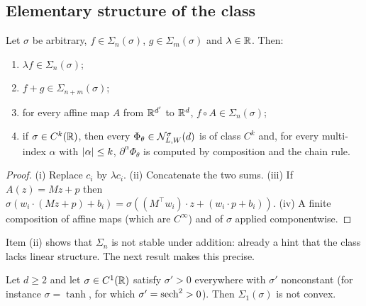 \documentclass[11pt,a4paper]{article}
\begin{document}
\subsection{Elementary structure of the class}

\begin{proposition}\label{prop:stable}
Let $\sigma$ be arbitrary, $f \in \Sigma_n(\sigma)$, $g \in \Sigma_m(\sigma)$ and $\lambda \in \mathbb{R}$.
Then:
\begin{enumerate}[label=(\roman*)]
\item $\lambda f \in \Sigma_n(\sigma)$;
\item $f + g \in \Sigma_{n+m}(\sigma)$;
\item for every affine map $A$ from $\mathbb{R}^{d'}$ to $\mathbb{R}^d$, $f \circ A \in \Sigma_n(\sigma)$;
\item if $\sigma \in C^k(\mathbb{R})$, then every $\Phi_\theta \in \mathcal{N}^\sigma_{L,W}(d)$ is of class $C^k$
and, for every multi-index $\alpha$ with $\left\lvert \alpha \right\rvert \le k$, $\partial^\alpha \Phi_\theta$ is
computed by composition and the chain rule.
\end{enumerate}
\end{proposition}

\begin{proof}
(i) Replace $c_i$ by $\lambda c_i$. (ii) Concatenate the two sums. (iii) If $A(z) = Mz + p$ then
$\sigma(w_i\cdot(Mz+p)+b_i) = \sigma((M^{\!\top}w_i)\cdot z + (w_i\cdot p + b_i))$.
(iv) A finite composition of affine maps (which are $C^\infty$) and of $\sigma$ applied
componentwise.
\end{proof}

Item (ii) shows that $\Sigma_n$ is not stable under addition: already a hint that the class lacks
linear structure. The next result makes this precise.

\begin{proposition}\label{prop:nonconvex}
Let $d \ge 2$ and let $\sigma \in C^1(\mathbb{R})$ satisfy $\sigma' > 0$ everywhere with $\sigma'$
nonconstant (for instance $\sigma = \tanh$, for which $\sigma' = \operatorname{sech}^2 > 0$). Then
$\Sigma_1(\sigma)$ is not convex.
\end{proposition}
\end{document}
